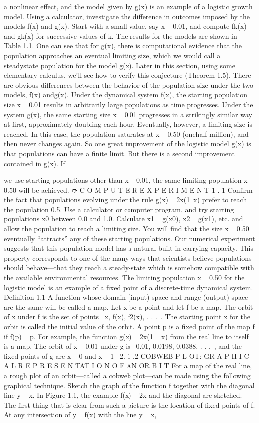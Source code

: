 \documentclass{article}
\begin{document}
a nonlinear effect, and the model given by g(x) is an example of a logistic growth
model.
Using a calculator, investigate the difference in outcomes imposed by the
models f(x) and g(x). Start with a small value, say x   0.01, and compute fk(x)
and gk(x) for successive values of k. The results for the models are shown in
Table 1.1. One can see that for g(x), there is computational evidence that the
population approaches an eventual limiting size, which we would call a steadystate
population for the model g(x). Later in this section, using some elementary
calculus, we’ll see how to verify this conjecture (Theorem 1.5).
There are obvious differences between the behavior of the population size
under the two models, f(x) andg(x). Under the dynamical system f(x), the starting
population size x   0.01 results in arbitrarily large populations as time progresses.
Under the system g(x), the same starting size x   0.01 progresses in a strikingly
similar way at first, approximately doubling each hour. Eventually, however, a
limiting size is reached. In this case, the population saturates at x   0.50 (onehalf
million), and then never changes again.
So one great improvement of the logistic model g(x) is that populations
can have a finite limit. But there is a second improvement contained in g(x). If

we use starting populations other than x   0.01, the same limiting population
x   0.50 will be achieved.
➮ C O M P U T E R E X P E R I M E N T 1 . 1
Confirm the fact that populations evolving under the rule g(x)   2x(1 x)
prefer to reach the population 0.5. Use a calculator or computer program, and try
starting populations x0 between 0.0 and 1.0. Calculate x1   g(x0), x2   g(x1),
etc. and allow the population to reach a limiting size. You will find that the size
x   0.50 eventually “attracts” any of these starting populations.
Our numerical experiment suggests that this population model has a natural
built-in carrying capacity. This property corresponds to one of the many ways
that scientists believe populations should behave—that they reach a steady-state
which is somehow compatible with the available environmental resources. The
limiting population x   0.50 for the logistic model is an example of a fixed point
of a discrete-time dynamical system.
Definition 1.1 A function whose domain (input) space and range (output)
space are the same will be called a map. Let x be a point and let f be a map.
The orbit of x under f is the set of points  x, f(x), f2(x), . . . . The starting point
x for the orbit is called the initial value of the orbit. A point p is a fixed point of
the map f if f(p)   p.
For example, the function g(x)   2x(1   x) from the real line to itself is a
map. The orbit of x   0.01 under g is  0.01, 0.0198, 0.0388, . . . , and the fixed
points of g are x   0 and x   1  2.
1 .2 COBWEB P L OT: GR A P H I C A L
R E P R E S E N TAT I O N O F AN OR B I T
For a map of the real line, a rough plot of an orbit—called a cobweb plot—can be
made using the following graphical technique. Sketch the graph of the function
f together with the diagonal line y   x. In Figure 1.1, the example f(x)   2x and
the diagonal are sketched. The first thing that is clear from such a picture is the
location of fixed points of f. At any intersection of y   f(x) with the line y   x,
\end{document}
